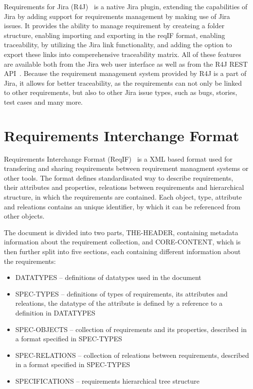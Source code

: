 Requirements for Jira (R4J) \cite{requirements_for_jira} is a native Jira plugin, extending the capabilities of Jira by adding support for requirements management by making use of Jira issues. It provides the ability to manage requirement by createing a folder structure, enabling importing and exporting in the reqIF format, enabling traceability, by utilizing the Jira link functionality, and adding the option to export these links into comperehensive traceability matrix. All of these features are available both from the Jira web user interface as well as from the R4J REST API \cite{r4j_api}. Because the requirement management system provided by R4J is a part of Jira, it allows for better traceability, as the requirements can not only be linked to other requirements, but also to other Jira issue types, such as bugs, stories, test cases and many more.

\section{Requirements Interchange Format}
Requirements Interchange Format (ReqIF) \cite{reqif_standard} is a XML based format used for transfering and sharing requirements between requirement managment systems or other tools. The format defines standardisated way to describe requirements, their attributes and properties, releations between requirements and hierarchical structure, in which the requirements are contained. Each object, type, attribute and releations contains an unique identifier, by which it can be referenced from other objects.

The document is divided into two parts, THE-HEADER, containing metadata information about the requirement collection, and CORE-CONTENT, which is then further split into five sections, each containing different information about the requirements:

\begin{itemize}
  \item DATATYPES -- definitions of datatypes used in the document
  \item SPEC-TYPES -- definitions of types of requirements, its attributes and releations, the datatype of the attribute is defined by a reference to a definition in DATATYPES
  \item SPEC-OBJECTS -- collection of requirements and its properties, described in a format specified in SPEC-TYPES
  \item SPEC-RELATIONS -- collection of releations between requirements, described in a format specified in SPEC-TYPES
  \item SPECIFICATIONS -- requirements hierarchical tree structure
\end{itemize}

